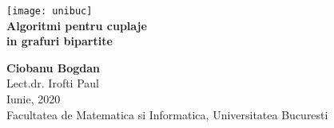 \begin{titlepage}
  \vspace{1 in}
  \begin{center}
    \hspace{4in} \texttt{[image: unibuc]}
    \\
    \huge
    \textbf{Algoritmi pentru cuplaje \\ in grafuri bipartite} \\
    \vspace{0.8 in}

    \Large
    \textbf{Ciobanu Bogdan} \\
    Lect.dr. Irofti Paul \\

    \vspace*{\fill}
    Iunie, 2020 \\
    Facultatea de Matematica si Informatica, Universitatea Bucuresti \\

  \end{center}
\end{titlepage}
